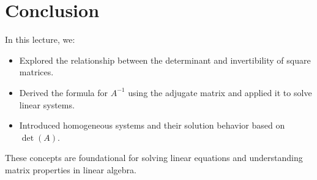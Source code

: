 \documentclass{article}
\begin{document}
\section*{Conclusion}

In this lecture, we:
\begin{itemize}
  \item Explored the relationship between the determinant and invertibility of square matrices.
  \item Derived the formula for $A^{-1}$ using the adjugate matrix and applied it to solve linear systems.
  \item Introduced homogeneous systems and their solution behavior based on $\det(A)$.
\end{itemize}

These concepts are foundational for solving linear equations and understanding matrix properties in linear algebra.
\end{document}
